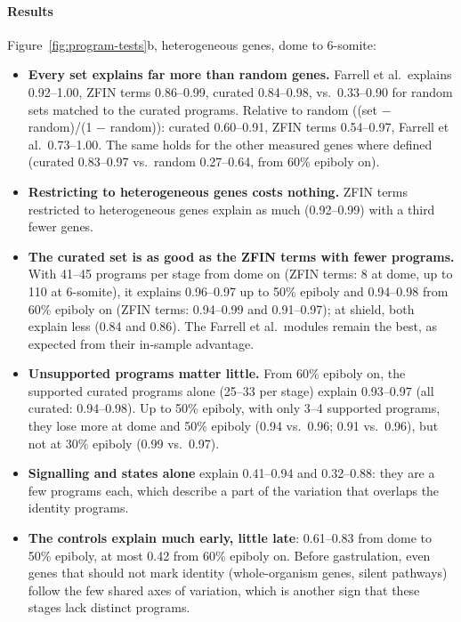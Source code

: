 \documentclass[11pt,a4paper]{article}
\begin{document}
\paragraph{Results} Figure~\ref{fig:program-tests}b, heterogeneous genes, dome to 6-somite:
\begin{itemize}
	\item \textbf{Every set explains far more than random genes.} Farrell et al.\ explains 0.92--1.00, ZFIN terms 0.86--0.99, curated 0.84--0.98, vs.\ 0.33--0.90 for random sets matched to the curated programs. Relative to random ((set $-$ random)/(1 $-$ random)): curated 0.60--0.91, ZFIN terms 0.54--0.97, Farrell et al.\ 0.73--1.00. The same holds for the other measured genes where defined (curated 0.83--0.97 vs.\ random 0.27--0.64, from 60\% epiboly on).
	\item \textbf{Restricting to heterogeneous genes costs nothing.} ZFIN terms restricted to heterogeneous genes explain as much (0.92--0.99) with a third fewer genes.
	\item \textbf{The curated set is as good as the ZFIN terms with fewer programs.} With 41--45 programs per stage from dome on (ZFIN terms: 8 at dome, up to 110 at 6-somite), it explains 0.96--0.97 up to 50\% epiboly and 0.94--0.98 from 60\% epiboly on (ZFIN terms: 0.94--0.99 and 0.91--0.97); at shield, both explain less (0.84 and 0.86). The Farrell et al.\ modules remain the best, as expected from their in-sample advantage.
	\item \textbf{Unsupported programs matter little.} From 60\% epiboly on, the supported curated programs alone (25--33 per stage) explain 0.93--0.97 (all curated: 0.94--0.98). Up to 50\% epiboly, with only 3--4 supported programs, they lose more at dome and 50\% epiboly (0.94 vs.\ 0.96; 0.91 vs.\ 0.96), but not at 30\% epiboly (0.99 vs.\ 0.97).
	\item \textbf{Signalling and states alone} explain 0.41--0.94 and 0.32--0.88: they are a few programs each, which describe a part of the variation that overlaps the identity programs.
	\item \textbf{The controls explain much early, little late}: 0.61--0.83 from dome to 50\% epiboly, at most 0.42 from 60\% epiboly on. Before gastrulation, even genes that should not mark identity (whole-organism genes, silent pathways) follow the few shared axes of variation, which is another sign that these stages lack distinct programs.

\end{itemize}
\end{document}
